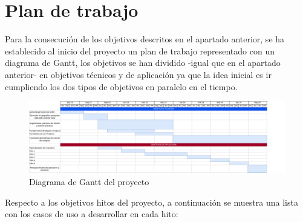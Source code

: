 \section{Plan de trabajo}
Para la consecución de los objetivos descritos en el apartado anterior, se ha establecido al inicio del proyecto un plan de trabajo representado con un diagrama de Gantt, los objetivos se han dividido -igual que en el apartado anterior- en objetivos técnicos y de aplicación ya que la idea inicial es ir cumpliendo los dos tipos de objetivos en paralelo en el tiempo.
\begin{figure}[h]
	\centering
	\includegraphics[width = 1\textwidth]{Imagenes/Bitmap/Gantt_Diagram.png}
	\caption{Diagrama de Gantt del proyecto}
	\label{fig:Gantt}
\end{figure}
Respecto a los objetivos hitos del proyecto, a continuación se muestra una lista con los casos de uso a desarrollar en cada hito:
